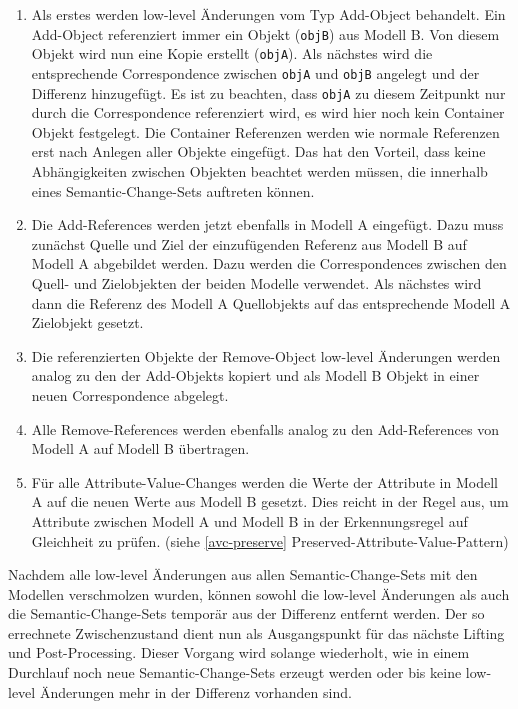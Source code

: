 \begin{enumerate}
  \item Als erstes werden low-level Änderungen vom Typ Add-Object behandelt. Ein Add-Object
  referenziert immer ein Objekt (\texttt{objB}) aus Modell B. Von diesem Objekt wird nun eine Kopie
  erstellt (\texttt{objA}). Als nächstes wird die entsprechende Correspondence zwischen
  \texttt{objA} und \texttt{objB} angelegt und der Differenz hinzugefügt. Es ist zu beachten, dass 
  \texttt{objA} zu diesem Zeitpunkt nur durch die Correspondence referenziert wird, es wird hier
  noch kein Container Objekt festgelegt. Die Container Referenzen werden wie normale Referenzen erst
  nach Anlegen aller Objekte eingefügt. Das hat den Vorteil, dass keine Abhängigkeiten zwischen
  Objekten beachtet werden müssen, die innerhalb eines Semantic-Change-Sets auftreten können.
 
  \item Die Add-References werden jetzt ebenfalls in Modell A eingefügt. Dazu muss zunächst
  Quelle und Ziel der einzufügenden Referenz aus Modell B auf Modell A abgebildet werden. Dazu
  werden die Correspondences zwischen den Quell- und Zielobjekten der beiden Modelle verwendet. Als
  nächstes wird dann die Referenz des Modell A Quellobjekts auf das entsprechende Modell A
  Zielobjekt gesetzt.
  
  \item Die referenzierten Objekte der Remove-Object low-level Änderungen werden analog zu den
  der Add-Objekts kopiert und als Modell B Objekt in einer neuen Correspondence abgelegt.
 
  \item Alle Remove-References werden ebenfalls analog zu den Add-References von Modell A auf
  Modell B übertragen.
  
  \item Für alle Attribute-Value-Changes werden die Werte der Attribute in Modell A auf die neuen
  Werte aus Modell B gesetzt. Dies reicht in der Regel aus, um Attribute zwischen Modell A und
  Modell B in der Erkennungsregel auf Gleichheit zu prüfen. (siehe \ref{avc-preserve}
  Preserved-Attribute-Value-Pattern)
\end{enumerate}
Nachdem alle low-level Änderungen aus allen Semantic-Change-Sets mit den Modellen verschmolzen
wurden, können sowohl die low-level Änderungen als auch die Semantic-Change-Sets temporär aus der
Differenz entfernt werden. Der so errechnete Zwischenzustand dient nun als Ausgangspunkt für das
nächste Lifting und Post-Processing. Dieser Vorgang wird solange wiederholt, wie in einem Durchlauf
noch neue Semantic-Change-Sets erzeugt werden oder bis keine low-level Änderungen mehr in der
Differenz vorhanden sind. 

